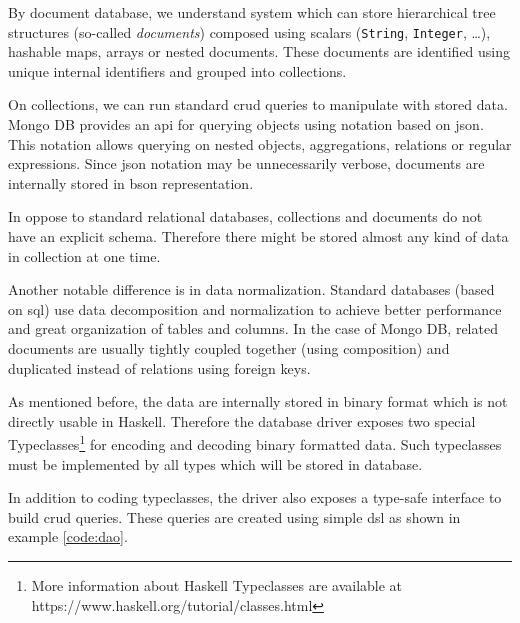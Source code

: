 By document database, we understand system which can store hierarchical tree structures (so-called \textit{documents}) composed using scalars (\texttt{String}, \texttt{Integer}, \dots), hashable maps, arrays or nested documents\cite{aws-document-database}.
These documents are identified using unique internal identifiers and grouped into collections.

On collections, we can run standard \gls{crud} queries to manipulate with stored data.
Mongo DB provides an \gls{api} for querying objects using notation based on \gls{json}.
This notation allows querying on nested objects, aggregations, relations or regular expressions.
Since \gls{json} notation may be unnecessarily verbose, documents are internally stored in \gls{bson} representation\cite{ip-mongo}.


In oppose to standard relational databases, collections and documents do not have an explicit schema.
Therefore there might be stored almost any kind of data in collection at one time.

Another notable difference is in data normalization.
Standard databases (based on \gls{sql}) use data decomposition and normalization to achieve better performance and great organization of tables and columns.
In the case of Mongo DB, related documents are usually tightly coupled together (using composition) and duplicated instead of relations using foreign keys.

As mentioned before, the data are internally stored in binary format which is not directly usable in Haskell.
Therefore the database driver exposes two special Typeclasses\footnote{More information about Haskell Typeclasses are available at https://www.haskell.org/tutorial/classes.html} for encoding and decoding binary formatted data.
Such typeclasses must be implemented by all types which will be stored in database.


In addition to coding typeclasses, the driver also exposes a type-safe interface to build \gls{crud} queries.
These queries are created using simple \gls{dsl} as shown in example \ref{code:dao}.
